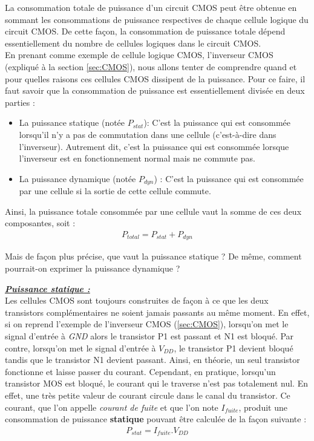 \documentclass[oneside]{book}
\begin{document}
La consommation totale de puissance d'un circuit CMOS peut être obtenue en sommant les consommations de puissance respectives de chaque cellule logique du circuit CMOS. De cette façon, la consommation de puissance totale dépend essentiellement du nombre de cellules logiques dans le circuit CMOS. \\
En prenant comme exemple de cellule logique CMOS, l'inverseur CMOS (expliqué à la section \ref{sec:CMOS}), nous allons tenter de comprendre quand et pour quelles raisons ces cellules CMOS dissipent de la puissance. Pour ce faire, il faut savoir que la consommation de puissance est essentiellement divisée en deux parties : 
\begin{itemize}
\item La puissance statique (notée $P_{stat}$): C'est la puissance qui est consommée lorsqu'il n'y a pas de commutation dans une cellule (c'est-à-dire dans l'inverseur). Autrement dit, c'est la puissance qui est consommée lorsque l'inverseur est en fonctionnement normal mais ne commute pas.
\item La puissance dynamique (notée $P_{dyn}$) : C'est la puissance qui est consommée par une cellule si la sortie de cette cellule commute. 
\end{itemize}
Ainsi, la puissance totale consommée par une cellule vaut la somme de ces deux composantes, soit :
\begin{gather}
	P_{total} = P_{stat} + P_{dyn}
\end{gather}

Mais de façon plus précise, que vaut la puissance statique ? De même, comment pourrait-on exprimer la puissance dynamique ? 

\hspace{-0.5 cm}\underline{\textbf{\textit{Puissance statique :}}} \vspace{0.2 cm} \\
Les cellules CMOS sont toujours construites de façon à ce que les deux transistors complémentaires ne soient jamais passants au même moment. En effet, si on reprend l'exemple de l'inverseur CMOS (\ref{sec:CMOS}), lorsqu'on met le signal d'entrée à \textit{GND} alors le transistor P1 est passant et N1 est bloqué. Par contre, lorsqu'on met le signal d'entrée à \textit{$V_{DD}$}, le transistor P1 devient bloqué tandis que le transistor N1 devient passant. Ainsi, en théorie, un seul transistor fonctionne et laisse passer du courant. Cependant, en pratique, lorsqu'un transistor MOS est bloqué, le courant qui le traverse n'est pas totalement nul. En effet, une très petite valeur de courant circule dans le canal du transistor. Ce courant, que l'on appelle \textit{courant de fuite} et que l'on note \textit{$I_{fuite}$}, produit une consommation de puissance \textbf{statique} pouvant être calculée de la façon suivante :
\begin{gather}
	P_{stat} = I_{fuite} . V_{DD}
\end{gather}
\end{document}
